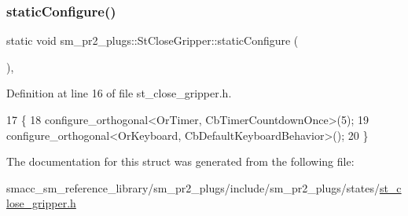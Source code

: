 \subsubsection{\texorpdfstring{static\+Configure()}{staticConfigure()}}
{\footnotesize\ttfamily static void sm\+\_\+pr2\+\_\+plugs\+::\+St\+Close\+Gripper\+::static\+Configure (\begin{DoxyParamCaption}{ }\end{DoxyParamCaption})\hspace{0.3cm}{\ttfamily [inline]}, {\ttfamily [static]}}



Definition at line 16 of file st\+\_\+close\+\_\+gripper.\+h.


\begin{DoxyCode}
17     \{
18         configure\_orthogonal<OrTimer,  CbTimerCountdownOnce>(5);    
19         configure\_orthogonal<OrKeyboard, CbDefaultKeyboardBehavior>();
20     \}
\end{DoxyCode}


The documentation for this struct was generated from the following file\+:\begin{DoxyCompactItemize}
\item 
smacc\+\_\+sm\+\_\+reference\+\_\+library/sm\+\_\+pr2\+\_\+plugs/include/sm\+\_\+pr2\+\_\+plugs/states/\hyperlink{st__close__gripper_8h}{st\+\_\+close\+\_\+gripper.\+h}\end{DoxyCompactItemize}
